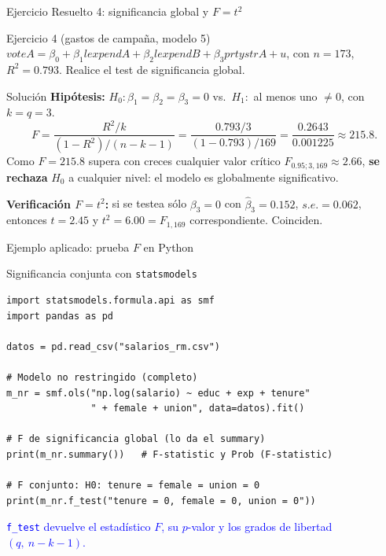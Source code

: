 \documentclass{beamer}
\begin{document}
\begin{frame}{Ejercicio Resuelto 4: significancia global y $F=t^2$}

\begin{block}{Ejercicio 4 (gastos de campaña, modelo 5)}
$voteA = \beta_0 + \beta_1 lexpendA + \beta_2 lexpendB + \beta_3 prtystrA + u$, con $n=173$, $R^2 = 0.793$. Realice el test de significancia global.
\end{block}

\pause

\begin{exampleblock}{Solución}
\textbf{Hipótesis:} $H_0: \beta_1=\beta_2=\beta_3=0$ vs.\ $H_1:$ al menos uno $\neq 0$, con $k=q=3$.
\[
F = \frac{R^2/k}{(1-R^2)/(n-k-1)} = \frac{0.793/3}{(1-0.793)/169} = \frac{0.2643}{0.001225} \approx 215.8.
\]
Como $F=215.8$ supera con creces cualquier valor crítico $F_{0.95;3,169}\approx 2.66$, \textbf{se rechaza} $H_0$ a cualquier nivel: el modelo es globalmente significativo.

\medskip
\textbf{Verificación $F=t^2$:} si se testea sólo $\beta_3=0$ con $\hat{\beta}_3 = 0.152$, $s.e.=0.062$, entonces $t = 2.45$ y $t^2 = 6.00 = F_{1,169}$ correspondiente. Coinciden.
\end{exampleblock}

\end{frame}

\begin{frame}[fragile]{Ejemplo aplicado: prueba $F$ en Python}

\begin{exampleblock}{Significancia conjunta con \texttt{statsmodels}}
\begin{verbatim}
import statsmodels.formula.api as smf
import pandas as pd

datos = pd.read_csv("salarios_rm.csv")

# Modelo no restringido (completo)
m_nr = smf.ols("np.log(salario) ~ educ + exp + tenure"
               " + female + union", data=datos).fit()

# F de significancia global (lo da el summary)
print(m_nr.summary())   # F-statistic y Prob (F-statistic)

# F conjunto: H0: tenure = female = union = 0
print(m_nr.f_test("tenure = 0, female = 0, union = 0"))
\end{verbatim}
\end{exampleblock}
\textcolor{blue}{\texttt{f\_test} devuelve el estadístico $F$, su $p$-valor y los grados de libertad $(q,\ n-k-1)$.}

\end{frame}
\end{document}
